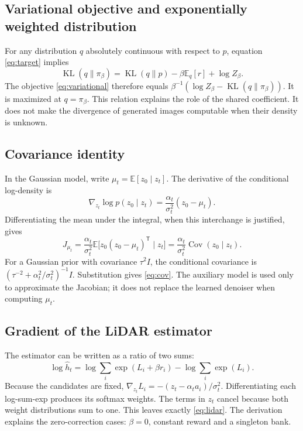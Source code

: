 \documentclass[11pt,a4paper]{article}
\newcommand{\E}{\mathbb{E}}
\newcommand{\Cov}{\operatorname{Cov}}
\newcommand{\KL}{\operatorname{KL}}
\begin{document}
\subsection{Variational objective and exponentially weighted distribution}
For any distribution $q$ absolutely continuous with respect to $p$, equation \eqref{eq:target} implies
\begin{equation}
\KL(q\|\pi_\beta)=\KL(q\|p)-\beta\E_q[r]+\log Z_\beta.
\end{equation}
The objective \eqref{eq:variational} therefore equals $\beta^{-1}(\log Z_\beta-\KL(q\|\pi_\beta))$. It is maximized at $q=\pi_\beta$. This relation explains the role of the shared coefficient. It does not make the divergence of generated images computable when their density is unknown.

\subsection{Covariance identity}
In the Gaussian model, write $\mu_t=\E[z_0\mid z_t]$. The derivative of the conditional log-density is
\begin{equation}
\nabla_{z_t}\log p(z_0\mid z_t)
=\frac{\alpha_t}{\sigma_t^2}(z_0-\mu_t).
\end{equation}
Differentiating the mean under the integral, when this interchange is justified, gives
\begin{equation}
J_{\mu_t}=\frac{\alpha_t}{\sigma_t^2}
\E\bigl[z_0(z_0-\mu_t)^{\mathsf T}\mid z_t\bigr]
=\frac{\alpha_t}{\sigma_t^2}\Cov(z_0\mid z_t).
\end{equation}
For a Gaussian prior with covariance $\tau^2I$, the conditional covariance is
$(\tau^{-2}+\alpha_t^2/\sigma_t^2)^{-1}I$. Substitution gives \eqref{eq:cov}. The auxiliary model is used only to approximate the Jacobian; it does not replace the learned denoiser when computing $\mu_t$.

\subsection{Gradient of the LiDAR estimator}
The estimator can be written as a ratio of two sums:
\begin{equation}
\log\widehat h_t
=\log\sum_i\exp(L_i+\beta r_i)-\log\sum_i\exp(L_i).
\end{equation}
Because the candidates are fixed, $\nabla_{z_t}L_i=-(z_t-\alpha_ta_i)/\sigma_t^2$. Differentiating each log-sum-exp produces its softmax weights. The terms in $z_t$ cancel because both weight distributions sum to one. This leaves exactly \eqref{eq:lidar}. The derivation explains the zero-correction cases: $\beta=0$, constant reward and a singleton bank.
\end{document}
